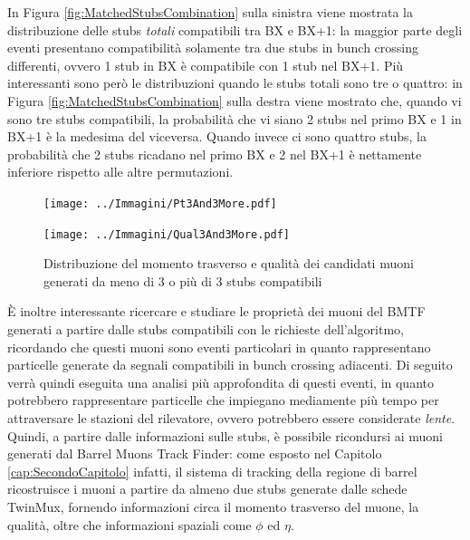In Figura \ref{fig:MatchedStubsCombination} sulla sinistra viene mostrata la distribuzione delle stubs \textit{totali} compatibili tra BX e BX+1: la maggior parte degli eventi presentano compatibilità solamente tra due stubs in bunch crossing differenti, ovvero 1 stub in BX è compatibile con 1 stub nel BX+1. Più interessanti sono però le distribuzioni quando le stubs totali sono tre o quattro: in Figura \ref{fig:MatchedStubsCombination} sulla destra viene mostrato che, quando vi sono tre stubs compatibili, la probabilità che vi siano 2 stubs nel primo BX e 1 in BX+1 è la medesima del viceversa. Quando invece ci sono quattro stubs, la probabilità che 2 stubs ricadano nel primo BX e 2 nel BX+1 è nettamente inferiore rispetto alle altre permutazioni. 



\begin{figure}[t]
  \centering
  \begin{minipage}[b]{0.48\textwidth}
    \centering
    \texttt{[image: ../Immagini/Pt3And3More.pdf]} 
    \end{minipage}
    \hfill 
    \begin{minipage}[b]{0.48\textwidth}
      \centering
      \texttt{[image: ../Immagini/Qual3And3More.pdf]} 
    \end{minipage}
    \caption{Distribuzione del momento trasverso e qualità dei candidati muoni generati da meno di 3 o più di 3 stubs compatibili}
  \label{fig:PtQual3And3More}
\end{figure}




È inoltre interessante ricercare e studiare le proprietà dei muoni del BMTF generati a partire dalle stubs compatibili con le richieste dell'algoritmo, ricordando che questi muoni sono eventi particolari in quanto rappresentano particelle generate da segnali compatibili in bunch crossing adiacenti. 
Di seguito verrà quindi eseguita una analisi più approfondita di questi eventi, in quanto potrebbero rappresentare particelle che impiegano mediamente più tempo per attraversare le stazioni del rilevatore, ovvero potrebbero essere considerate \textit{lente}.\newline
Quindi, a partire dalle informazioni sulle stubs, è possibile ricondursi ai muoni generati dal Barrel Muons Track Finder: come esposto nel Capitolo \ref{cap:SecondoCapitolo} infatti, il sistema di tracking della regione di barrel ricostruisce i muoni a partire da almeno due stubs generate dalle schede TwinMux, fornendo informazioni circa il momento trasverso del muone, la qualità, oltre che informazioni spaziali come $\phi$ ed $\eta$. 

